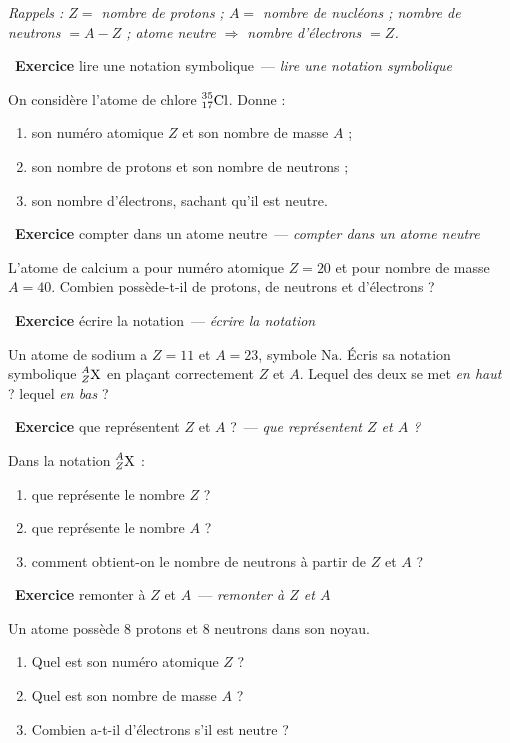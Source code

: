 \documentclass[11pt,a4paper]{article}
\newcommand{\nuc}[3]{\prescript{#1}{#2}{\mathrm{#3}}}
\newcounter{exo}
\newcommand{\exo}[1][]{\stepcounter{exo}\par\medskip%
  \noindent{\color{primary}\rule[-2pt]{3.5pt}{15pt}}\ \textbf{\color{primarydark}\large Exercice \theexo}%
  \ifx\relax#1\relax\relax\else\ \textmd{\normalsize\color{black!65}— \itshape #1}\fi\par\nopagebreak\smallskip}
\begin{document}

\vspace{3pt}
{\small\itshape Rappels : $Z = $ nombre de protons ; $A = $ nombre de nucléons ; nombre de neutrons
$= A - Z$ ; atome neutre $\Rightarrow$ nombre d'électrons $= Z$.}

\exo[lire une notation symbolique]
On considère l'atome de chlore $\nuc{35}{17}{Cl}$. Donne :
\begin{enumerate}[label=\alph*)]
  \item son numéro atomique $Z$ et son nombre de masse $A$ ;
  \item son nombre de protons et son nombre de neutrons ;
  \item son nombre d'électrons, sachant qu'il est neutre.
\end{enumerate}

\exo[compter dans un atome neutre]
L'atome de calcium a pour numéro atomique $Z = 20$ et pour nombre de masse $A = 40$. Combien
possède-t-il de protons, de neutrons et d'électrons ?

\exo[écrire la notation]
Un atome de sodium a $Z = 11$ et $A = 23$, symbole $\mathrm{Na}$. Écris sa notation symbolique
$\nuc{A}{Z}{X}$ en plaçant correctement $Z$ et $A$. Lequel des deux se met \emph{en haut} ? lequel
\emph{en bas} ?

\exo[que représentent $Z$ et $A$ ?]
Dans la notation $\nuc{A}{Z}{X}$ :
\begin{enumerate}[label=\alph*)]
  \item que représente le nombre $Z$ ?
  \item que représente le nombre $A$ ?
  \item comment obtient-on le nombre de neutrons à partir de $Z$ et $A$ ?
\end{enumerate}

\exo[remonter à $Z$ et $A$]
Un atome possède $8$ protons et $8$ neutrons dans son noyau.
\begin{enumerate}[label=\alph*)]
  \item Quel est son numéro atomique $Z$ ?
  \item Quel est son nombre de masse $A$ ?
  \item Combien a-t-il d'électrons s'il est neutre ?
\end{enumerate}
\end{document}
